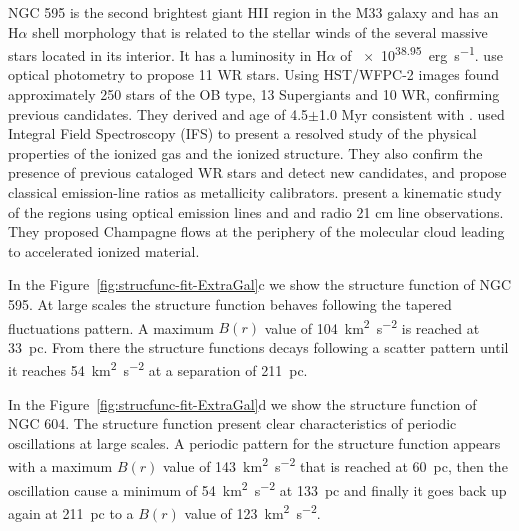 \documentclass[fleqn,usenatbib, useAMS, a4paper]{mnras}
\newcommand\pos{\ensuremath{_{\mathrm{pos}}}}
\newcommand\ha{\ensuremath{\text{H}\alpha}}
\begin{document}
NGC 595 is the second brightest giant HII region in the M33 galaxy and has an \ha{} shell morphology that is related to the stellar winds of the several massive stars located in its interior.
It has a luminosity in \ha{} of \SI{e38.95}{erg.s^{-1}}\citep{2002MNRAS.329..481B}.
\citet{1993AJ....105.1400D} use optical photometry to propose 11 WR stars. 
Using HST/WFPC-2 images \citet{1996AJ....111.1128M} found approximately 250 stars of the OB type, 13 Supergiants and 10 WR, confirming previous candidates.
They derived and age of 4.5\(\pm\)1.0 Myr consistent with \citet{1993AJ....105.1400D}.
\citet{2010MNRAS.402.1635R} used Integral Field Spectroscopy (IFS) to present a resolved study of the physical properties of the ionized gas and the ionized structure.
They also confirm the presence of previous cataloged WR stars and detect new candidates, and propose classical emission-line ratios as metallicity calibrators.
\citet{lagrois2011} present a kinematic study of the regions using optical emission lines and and radio 21 cm line observations.
They proposed Champagne flows at the periphery of the molecular cloud leading to accelerated ionized material.

In the Figure~\ref{fig:strucfunc-fit-ExtraGal}c we show the structure function of NGC 595.
At large scales the structure function behaves following the tapered fluctuations pattern.
A maximum \(B(r)\) value of \SI{104}{km^{2}.s^{-2}} is reached at \SI{33}{pc}. 
From there the structure functions decays following a scatter pattern until it reaches \SI{54}{km^{2}.s^{-2}} at a separation of \SI{211}{pc}.

In the Figure~\ref{fig:strucfunc-fit-ExtraGal}d we show the structure function of NGC 604.
The structure function present clear characteristics of periodic oscillations at large scales.
A periodic pattern for the structure function appears with a maximum \(B(r)\) value of \SI{143}{km^{2}.s^{-2}} that is reached at \SI{60}{pc}, then the oscillation cause a minimum of \SI{54}{km^{2}.s^{-2}} at \SI{133}{pc} and finally it goes back up again at \SI{211}{pc} to a \(B(r)\) value of \SI{123}{km^{2}.s^{-2}}.
\end{document}
